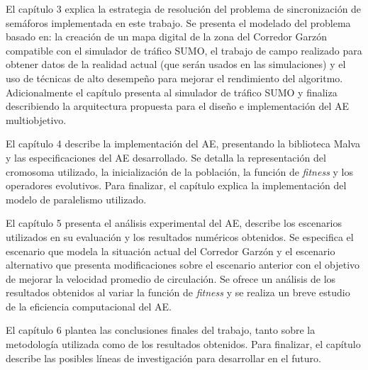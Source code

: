 El capítulo 3 explica la estrategia de resolución del problema de sincronización de semáforos implementada en este trabajo. Se presenta el modelado del problema basado en: la creación de un mapa digital de la zona del Corredor Garzón compatible con el simulador de tráfico SUMO, el trabajo de campo realizado para obtener datos de la realidad actual (que serán usados en las simulaciones) y el uso de técnicas de alto desempeño para mejorar el rendimiento del algoritmo. Adicionalmente el capítulo presenta al simulador de tráfico SUMO y finaliza describiendo la arquitectura propuesta para el diseño e implementación del AE multiobjetivo.

El capítulo 4 describe la implementación del AE, presentando la biblioteca Malva y las especificaciones del AE desarrollado. Se detalla la representación del cromosoma utilizado, la inicialización de la población, la función de \emph{fitness} y los operadores evolutivos. Para finalizar, el capítulo explica la implementación del modelo de paralelismo utilizado.

El capítulo 5 presenta el análisis experimental del AE, describe los escenarios utilizados en su evaluación y los resultados numéricos obtenidos. Se especifica el escenario que modela la situación actual del Corredor Garzón y el escenario alternativo que presenta modificaciones sobre el escenario anterior con el objetivo de mejorar la velocidad promedio de circulación. Se ofrece un análisis de los resultados obtenidos al variar la función de \emph{fitness} y se realiza un breve estudio de la eficiencia computacional del AE.

El capítulo 6 plantea las conclusiones finales del trabajo, tanto sobre la metodología utilizada como de los resultados obtenidos. Para finalizar, el capítulo describe las posibles líneas de investigación para desarrollar en el futuro.






